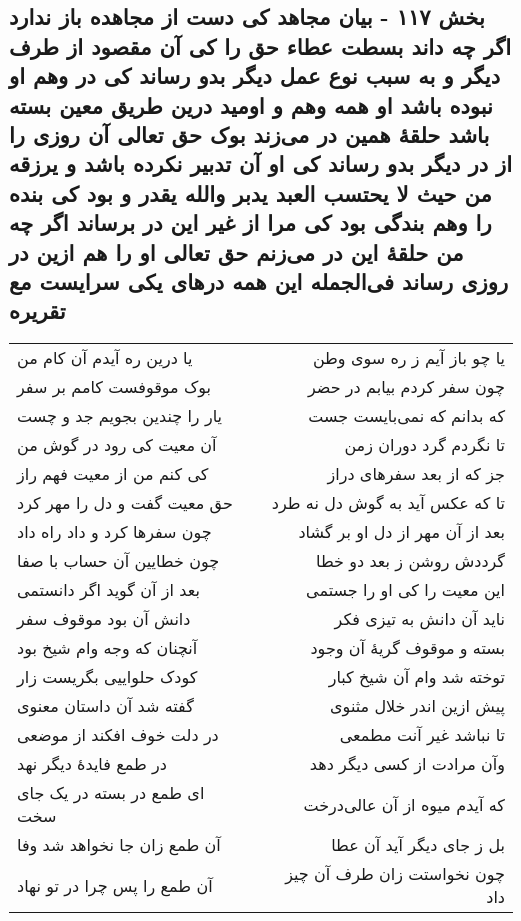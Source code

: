 \begin{center}
\section*{بخش ۱۱۷ - بیان مجاهد کی دست از مجاهده باز ندارد اگر چه داند بسطت عطاء حق را کی آن مقصود از طرف دیگر و به سبب نوع عمل دیگر بدو رساند کی در وهم او نبوده باشد  او همه وهم و اومید درین طریق معین بسته باشد حلقهٔ همین در می‌زند بوک حق تعالی آن روزی را از در دیگر بدو رساند کی او آن تدبیر نکرده باشد و یرزقه من حیث لا یحتسب العبد یدبر والله یقدر و بود کی بنده را وهم بندگی بود کی مرا از غیر این در برساند اگر چه من حلقهٔ این در می‌زنم حق تعالی او را هم ازین در روزی رساند فی‌الجمله این  همه درهای یکی سرایست مع تقریره}
\label{sec:sh117}
\begin{longtable}{l p{0.5cm} r}
یا درین ره آیدم آن کام من
&&
یا چو باز آیم ز ره سوی وطن
\\
بوک موقوفست کامم بر سفر
&&
چون سفر کردم بیابم در حضر
\\
یار را چندین بجویم جد و چست
&&
که بدانم که نمی‌بایست جست
\\
آن معیت کی رود در گوش من
&&
تا نگردم گرد دوران زمن
\\
کی کنم من از معیت فهم راز
&&
جز که از بعد سفرهای دراز
\\
حق معیت گفت و دل را مهر کرد
&&
تا که عکس آید به گوش دل نه طرد
\\
چون سفرها کرد و داد راه داد
&&
بعد از آن مهر از دل او بر گشاد
\\
چون خطایین آن حساب با صفا
&&
گرددش روشن ز بعد دو خطا
\\
بعد از آن گوید اگر دانستمی
&&
این معیت را کی او را جستمی
\\
دانش آن بود موقوف سفر
&&
ناید آن دانش به تیزی فکر
\\
آنچنان که وجه وام شیخ بود
&&
بسته و موقوف گریهٔ آن وجود
\\
کودک حلواییی بگریست زار
&&
توخته شد وام آن شیخ کبار
\\
گفته شد آن داستان معنوی
&&
پیش ازین اندر خلال مثنوی
\\
در دلت خوف افکند از موضعی
&&
تا نباشد غیر آنت مطمعی
\\
در طمع فایدهٔ دیگر نهد
&&
وآن مرادت از کسی دیگر دهد
\\
ای طمع در بسته در یک جای سخت
&&
که آیدم میوه از آن عالی‌درخت
\\
آن طمع زان جا نخواهد شد وفا
&&
بل ز جای دیگر آید آن عطا
\\
آن طمع را پس چرا در تو نهاد
&&
چون نخواستت زان طرف آن چیز داد

\end{longtable}
\end{center}
